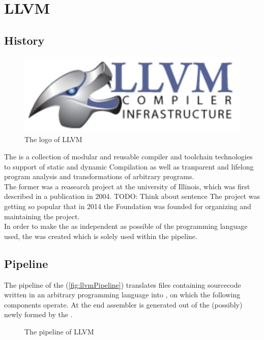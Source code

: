 \chapter{LLVM}
\section{History}
\begin{figure}
    \caption[The logo of LLVM]{The logo of LLVM \cite{llvmLogo}}
    \includegraphics[width=.5\textwidth]{gfx/llvmLogo.png}
\end{figure}
The \llvm is a collection of modular and reusable compiler and toolchain technologies to support of static and dynamic Compilation as well as tranparent and lifelong program analysis and transformations of arbitrary programs. \cite{LLVMWebsite, LLVMResearchBeginning}\\
The \llvm former was a reasearch project at the university of Illinois, which was first described in a publication in 2004. TODO: Think about sentence
The project was getting so popular that in 2014 the \llvm Foundation was founded for organizing and maintaining the project. \cite{LLVMFoundation}\\
In order to make the \llvm as independent as possible of the programming language used, the \llvmir was created which is solely used within the pipeline.

\section{Pipeline}
The pipeline of the \llvm (\autoref{fig:llvmPipeline}) translates files containing sourcecode written in an arbitrary programming language into \llvmir, on which the following components operate.
At the end assembler is generated out of the (possibly) newly formed \llvmir by the \generator. \cite{IntroLLVM}
\begin{figure}[!ht]
    \caption{The pipeline of LLVM}
    \label{fig:llvmPipeline}
    \centering
\end{figure}\\
